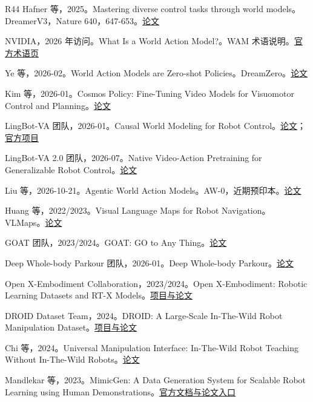 \documentclass[UTF8,a4paper,11pt,oneside,openany,fontset=none]{ctexbook}
\begin{document}
\begin{thebibliography}{R44}
 Hafner 等，2025。Mastering diverse control tasks through world models。DreamerV3，Nature 640，647-653。\href{https://www.nature.com/articles/s41586-025-08744-2}{论文}

 NVIDIA，2026 年访问。What Is a World Action Model?。WAM 术语说明。\href{https://www.nvidia.com/en-us/glossary/world-action-model/}{官方术语页}

 Ye 等，2026-02。World Action Models are Zero-shot Policies。DreamZero。\href{https://arxiv.org/abs/2602.15922}{论文}

 Kim 等，2026-01。Cosmos Policy: Fine-Tuning Video Models for Visuomotor Control and Planning。\href{https://arxiv.org/abs/2601.16163}{论文}

 LingBot-VA 团队，2026-01。Causal World Modeling for Robot Control。\href{https://arxiv.org/abs/2601.21998}{论文}；\href{https://technology.robbyant.com/lingbot-va}{官方项目}

 LingBot-VA 2.0 团队，2026-07。Native Video-Action Pretraining for Generalizable Robot Control。\href{https://arxiv.org/abs/2607.08639}{论文}

 Liu 等，2026-10-21。Agentic World Action Models。AW-0，近期预印本。\href{https://arxiv.org/abs/2610.30136}{论文}

 Huang 等，2022/2023。Visual Language Maps for Robot Navigation。VLMaps。\href{https://arxiv.org/abs/2210.05714}{论文}

 GOAT 团队，2023/2024。GOAT: GO to Any Thing。\href{https://arxiv.org/abs/2311.06430}{论文}

 Deep Whole-body Parkour 团队，2026-01。Deep Whole-body Parkour。\href{https://arxiv.org/abs/2601.07701}{论文}

 Open X-Embodiment Collaboration，2023/2024。Open X-Embodiment: Robotic Learning Datasets and RT-X Models。\href{https://robotics-transformer-x.github.io/}{项目与论文}

 DROID Dataset Team，2024。DROID: A Large-Scale In-The-Wild Robot Manipulation Dataset。\href{https://droid-dataset.github.io/}{项目与论文}

 Chi 等，2024。Universal Manipulation Interface: In-The-Wild Robot Teaching Without In-The-Wild Robots。\href{https://arxiv.org/abs/2402.10329}{论文}

 Mandlekar 等，2023。MimicGen: A Data Generation System for Scalable Robot Learning using Human Demonstrations。\href{https://mimicgen.github.io/docs/introduction/overview.html}{官方文档与论文入口}


\end{thebibliography}
\end{document}
